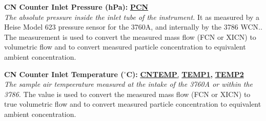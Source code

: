 \begin{hangparagraphs}
\textbf{CN Counter Inlet Pressure (hPa):}\textbf{ }\textbf{\uline{PCN}}\\
\emph{The absolute pressure inside the inlet tube of the instrument.}
It as measured by a Heise Model 623 pressure
sensor for the 3760A, and internally by the 3786 WCN.. The measurement
is used to convert the measured mass flow (FCN or XICN) to volumetric
flow and to convert measured particle concentration to equivalent
ambient concentration.

\textbf{CN Counter Inlet Temperature ($^{\circ}$C):}\textbf{
}\textbf{\uline{CNTEMP}}\uline{,}
\textbf{\uline{TEMP1}}\textbf{,
}\textbf{\uline{TEMP2}}\textbf{}\\
\emph{The sample air tempeerature measured at the intake of the 3760A
or within the 3786.} The value is used to
convert the measured mass flow (FCN or XICN) to true volumetric flow
and to convert measured particle concentration to equivalent ambient
concentration.


\end{hangparagraphs}
